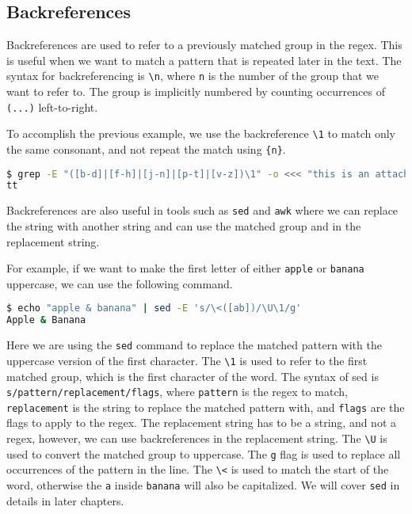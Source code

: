 \subsection{Backreferences}

Backreferences are used to refer to a previously matched group in the regex. This is useful when we want to match a pattern that is repeated later in the text. The syntax for backreferencing is \lstinline|\n|, where \lstinline|n| is the number of the group that we want to refer to. The group is implicitly numbered by counting occurrences of \lstinline|(...)| left-to-right.

To accomplish the previous example, we use the backreference \lstinline|\1| to match only the same consonant, and not repeat the match using \lstinline|{n}|.

\begin{lstlisting}[language=bash]
$ grep -E "([b-d]|[f-h]|[j-n]|[p-t]|[v-z])\1" -o <<< "this is an attached sentence"
tt
\end{lstlisting}

Backreferences are also useful in tools such as \lstinline|sed| and \lstinline|awk| where we can replace the string with another string and can use the matched group and in the replacement string.

For example, if we want to make the first letter of either \lstinline|apple| or \lstinline|banana| uppercase, we can use the following command.


\begin{lstlisting}[language=bash]
$ echo "apple & banana" | sed -E 's/\<([ab])/\U\1/g'
Apple & Banana
\end{lstlisting}

Here we are using the \lstinline|sed| command to replace the matched pattern with the uppercase version of the first character. The \lstinline|\1| is used to refer to the first matched group, which is the first character of the word.
The syntax of sed is \lstinline|s/pattern/replacement/flags|, where \lstinline|pattern| is the regex to match, \lstinline|replacement| is the string to replace the matched pattern with, and \lstinline|flags| are the flags to apply to the regex.
The replacement string has to be a string, and not a regex, however, we can use backreferences in the replacement string.
The \lstinline|\U| is used to convert the matched group to uppercase.
The \lstinline|g| flag is used to replace all occurrences of the pattern in the line.
The \lstinline|\<| is used to match the start of the word, otherwise the \lstinline|a| inside \lstinline|banana| will also be capitalized.
We will cover \lstinline|sed| in details in later chapters.


